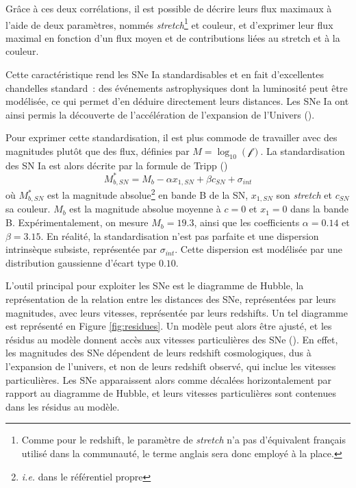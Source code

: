 \documentclass{book}
\let\mcl\mathcal
\begin{document}
Grâce à ces deux corrélations, il est possible de décrire leurs flux maximaux à l'aide de deux paramètres, nommés \textit{stretch}\footnote{Comme pour le redshift, le paramètre de \textit{stretch} n'a pas d'équivalent français utilisé dans la communauté, le terme anglais sera donc employé à la place.} et couleur, et d'exprimer leur flux maximal en fonction d'un flux moyen et de contributions liées au stretch et à la couleur.

Cette caractéristique rend les SNe Ia standardisables et en fait d'excellentes chandelles standard~: des événements astrophysiques dont la luminosité peut être modélisée, ce qui permet d'en déduire directement leurs distances. Les SNe Ia ont ainsi permis la découverte de l'accélération de l'expansion de l'Univers (\cite{perlmutter_cosmology_1998, riess_observational_1998}).

Pour exprimer cette standardisation, il est plus commode de travailler avec des magnitudes plutôt que des flux, définies par $M=\log_{10}(\mcl f)$. La standardisation des SN Ia est alors décrite par la formule de Tripp (\cite{tripp_two-parameter_1998})
\begin{equation}
\label{eq:tripp}
    M^*_{b,SN} = M_b - \alpha x_{1,SN} + \beta c_{SN} + \sigma_{int}
\end{equation}
où $M^*_{b,SN}$ est la magnitude absolue\footnote{\textit{i.e.} dans le référentiel propre} en bande B de la SN, $x_{1,SN}$ son \textit{stretch} et $c_{SN}$ sa couleur. $M_b$ est la magnitude absolue moyenne à $c=0$ et $x_1=0$ dans la bande B. Expérimentalement, on mesure $M_b=19.3$, ainsi que les coefficients $\alpha=0.14$ et $\beta=3.15$. En réalité, la standardisation n'est pas parfaite et une dispersion intrinsèque subsiste, représentée par $\sigma_{int}$. Cette dispersion est modélisée par une distribution gaussienne d'écart type $0.10$.

L'outil principal pour exploiter les SNe est le diagramme de Hubble, la représentation de la relation entre les distances des SNe, représentées par leurs magnitudes, avec leurs vitesses, représentée par leurs redshifts. Un tel diagramme est représenté en Figure \ref{fig:residues}. Un modèle peut alors être ajusté, et les résidus au modèle donnent accès aux vitesses particulières des SNe (\cite{davis_effect_2011}). En effet, les magnitudes des SNe dépendent de leurs redshift cosmologiques, dus à l'expansion de l'univers, et non de leurs redshift observé, qui inclue les vitesses particulières. Les SNe apparaissent alors comme décalées horizontalement par rapport au diagramme de Hubble, et leurs vitesses particulières sont contenues dans les résidus au modèle.
\end{document}
